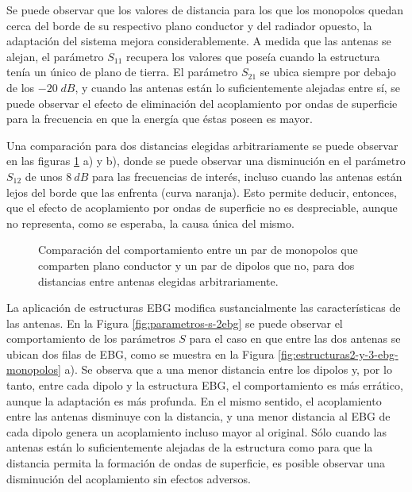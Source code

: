 Se puede observar que los valores de distancia para los que los monopolos quedan cerca del borde de su respectivo plano conductor y del radiador opuesto, la adaptación del sistema mejora considerablemente. A medida que las antenas se alejan, el parámetro $S_{11}$ recupera los valores que poseía cuando la estructura tenía un único de plano de tierra. El parámetro $S_{21}$ se ubica siempre por debajo de los $-20\;dB$, y cuando las antenas están lo suficientemente alejadas entre sí, se puede observar el efecto de eliminación del acoplamiento por ondas de superficie para la frecuencia en que la energía que éstas poseen es mayor.

Una comparación para dos distancias elegidas arbitrariamente se puede observar en las figuras \ref{fig:comparacion-monopolos-s-sinGND} a) y b), donde se puede observar una disminución en el parámetro $S_{12}$ de unos $8\ dB$ para las frecuencias de interés, incluso cuando las antenas están lejos del borde que las enfrenta (curva naranja). Esto permite deducir, entonces, que el efecto de acoplamiento por ondas de superficie no es despreciable, aunque no representa, como se esperaba, la causa única del mismo.


\begin{figure}[H]
	\centering 
	\hspace{0pt}
	\caption{Comparación del comportamiento entre un par de monopolos que comparten plano conductor y un par de dipolos que no, para dos distancias entre antenas elegidas arbitrariamente.}
	\label{fig:comparacion-monopolos-s-sinGND}
\end{figure} 


La aplicación de estructuras EBG modifica sustancialmente las características de las antenas. En la Figura \ref{fig:parametros-s-2ebg} se puede observar el comportamiento de los parámetros $S$ para el caso en que entre las dos antenas se ubican dos filas de EBG, como se muestra en la Figura \ref{fig:estructuras2-y-3-ebg-monopolos} a). Se observa que a una menor distancia entre los dipolos y, por lo tanto, entre cada dipolo y la estructura EBG, el comportamiento es más errático, aunque la adaptación es más profunda. En el mismo sentido, el acoplamiento entre las antenas disminuye con la distancia, y una menor distancia al EBG de cada dipolo genera un acoplamiento incluso mayor al original. Sólo cuando las antenas están lo suficientemente alejadas de la estructura como para que la distancia permita la formación de ondas de superficie, es posible observar una disminución del acoplamiento sin efectos adversos.


